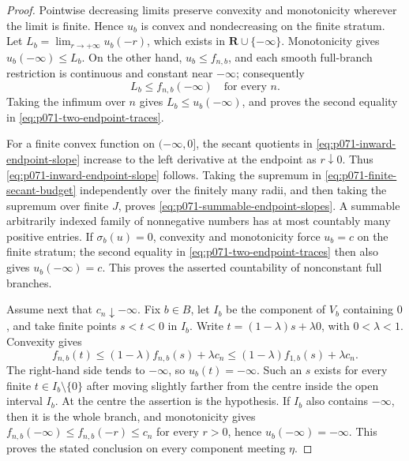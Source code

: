 \begin{proof}
Pointwise decreasing limits preserve convexity and monotonicity wherever
the limit is finite.  Hence \(u_b\) is convex and nondecreasing on the
finite stratum.  Let
\(L_b=\lim_{r\to+\infty}u_b(-r)\), which exists in
\(\mathbf R\cup\{-\infty\}\).  Monotonicity gives
\(u_b(-\infty)\leq L_b\).  On the other hand, \(u_b\leq f_{n,b}\), and
each smooth full-branch restriction is continuous and constant near
\(-\infty\); consequently
\[
 L_b\leq f_{n,b}(-\infty)
 \quad\text{for every }n.
\]
Taking the infimum over \(n\) gives
\(L_b\leq u_b(-\infty)\), and proves the second equality in
\eqref{eq:p071-two-endpoint-traces}.

For a finite convex function on \((-\infty,0]\), the secant quotients in
\eqref{eq:p071-inward-endpoint-slope} increase to the left derivative at
the endpoint as \(r\downarrow0\).  Thus
\eqref{eq:p071-inward-endpoint-slope} follows.  Taking the supremum in
\eqref{eq:p071-finite-secant-budget} independently over the finitely many
radii, and then taking the supremum over finite \(J\), proves
\eqref{eq:p071-summable-endpoint-slopes}.  A summable arbitrarily indexed
family of nonnegative numbers has at most countably many positive entries.
If \(\sigma_b(u)=0\), convexity and monotonicity force \(u_b=c\) on the
finite stratum; the second equality in
\eqref{eq:p071-two-endpoint-traces} then also gives
\(u_b(-\infty)=c\).  This proves the asserted countability of nonconstant
full branches.

Assume next that \(c_n\downarrow-\infty\).  Fix \(b\in B\), let \(I_b\)
be the component of \(V_b\) containing \(0\), and take finite points
\(s<t<0\) in \(I_b\).  Write \(t=(1-\lambda)s+\lambda0\), with
\(0<\lambda<1\).  Convexity gives
\[
 f_{n,b}(t)
 \leq(1-\lambda)f_{n,b}(s)+\lambda c_n
 \leq(1-\lambda)f_{1,b}(s)+\lambda c_n.
\]
The right-hand side tends to \(-\infty\), so \(u_b(t)=-\infty\).  Such an
\(s\) exists for every finite \(t\in I_b\setminus\{0\}\) after moving
slightly farther from the centre inside the open interval \(I_b\).
At the centre the assertion is the hypothesis.  If \(I_b\) also contains
\(-\infty\), then it is the whole branch, and monotonicity gives
\(f_{n,b}(-\infty)\leq f_{n,b}(-r)\leq c_n\) for every \(r>0\), hence
\(u_b(-\infty)=-\infty\).  This proves the stated conclusion on every
component meeting \(\eta\).


\end{proof}
